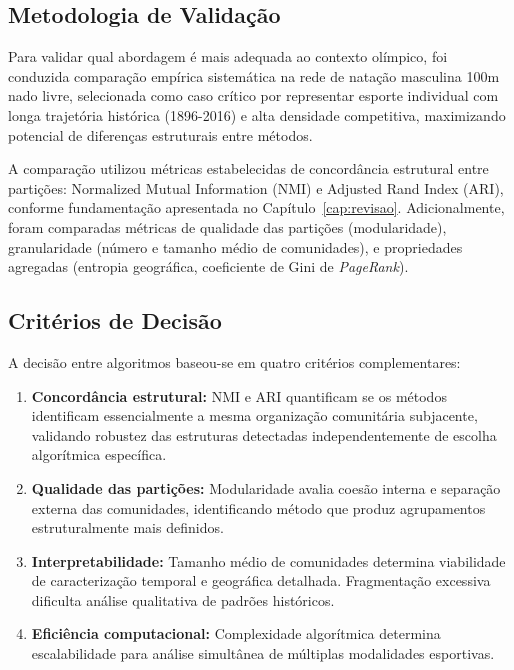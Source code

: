 \subsection{Metodologia de Validação}

Para validar qual abordagem é mais adequada ao contexto olímpico, foi conduzida comparação empírica sistemática na rede de natação masculina 100m nado livre, selecionada como caso crítico por representar esporte individual com longa trajetória histórica (1896-2016) e alta densidade competitiva, maximizando potencial de diferenças estruturais entre métodos.

A comparação utilizou métricas estabelecidas de concordância estrutural entre partições: Normalized Mutual Information (NMI) e Adjusted Rand Index (ARI), conforme fundamentação apresentada no Capítulo~\ref{cap:revisao}. Adicionalmente, foram comparadas métricas de qualidade das partições (modularidade), granularidade (número e tamanho médio de comunidades), e propriedades agregadas (entropia geográfica, coeficiente de Gini de \textit{PageRank}).

\subsection{Critérios de Decisão}

A decisão entre algoritmos baseou-se em quatro critérios complementares:

\begin{enumerate}
    \item \textbf{Concordância estrutural:} NMI e ARI quantificam se os métodos identificam essencialmente a mesma organização comunitária subjacente, validando robustez das estruturas detectadas independentemente de escolha algorítmica específica.

    \item \textbf{Qualidade das partições:} Modularidade avalia coesão interna e separação externa das comunidades, identificando método que produz agrupamentos estruturalmente mais definidos.

    \item \textbf{Interpretabilidade:} Tamanho médio de comunidades determina viabilidade de caracterização temporal e geográfica detalhada. Fragmentação excessiva dificulta análise qualitativa de padrões históricos.

    \item \textbf{Eficiência computacional:} Complexidade algorítmica determina escalabilidade para análise simultânea de múltiplas modalidades esportivas.
\end{enumerate}

